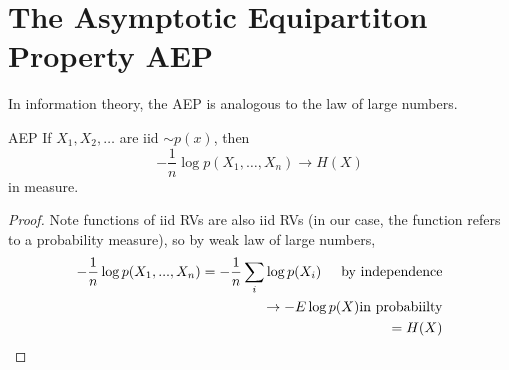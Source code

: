 \documentclass[../main.tex]{subfiles}
\begin{document}
\section{The Asymptotic Equipartiton Property AEP}
In information theory, the AEP is analogous to the law of large numbers.
\begin{bbox}{AEP}
    If $X_1,X_2,\dots$ are iid $\sim p(x)$, then \begin{equation*}
        -\frac{1}{n}\log p(X_1,\dots,X_n)\to H(X)
    \end{equation*} in measure.
    \begin{proof}
        Note functions of iid RVs are also iid RVs (in our case, the function refers to a probability measure), so by weak law of large numbers,\begin{align*}
            -\frac{1}{n}\log p(X_1,...,X_n) = -\frac{1}{n}\sum_i\log p(X_i) \hspace{5mm}\text{by independence}
            \\
            \to -E\log p(X) \text{in probabiilty}\\
            =H(X)
        \end{align*}
    \end{proof}
\end{bbox}
\end{document}
